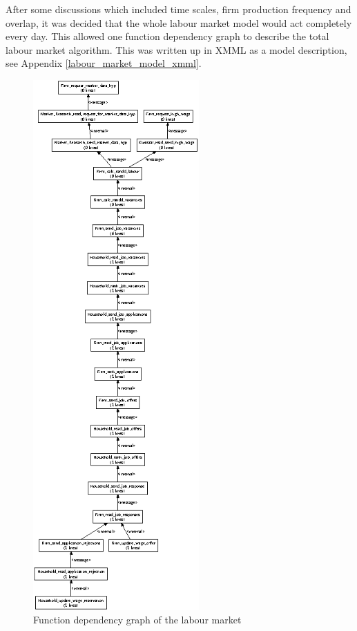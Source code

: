 \documentclass[a4paper,11pt]{article}
\begin{document}
After some discussions which included time scales, firm production
frequency and overlap, it was decided that the whole labour market
model would act completely every day. This allowed one function
dependency graph to describe the total labour market algorithm. This
was written up in XMML as a model description, see Appendix \ref{labour_market_model_xmml}.

\begin{figure}
\begin{center}
\includegraphics*[width=2.5in]{labour_market_bielefeld_dgraph.eps}%
\caption{Function dependency graph of the labour market} \label{fig:labdgraph}
\end{center}
\end{figure}
\end{document}
